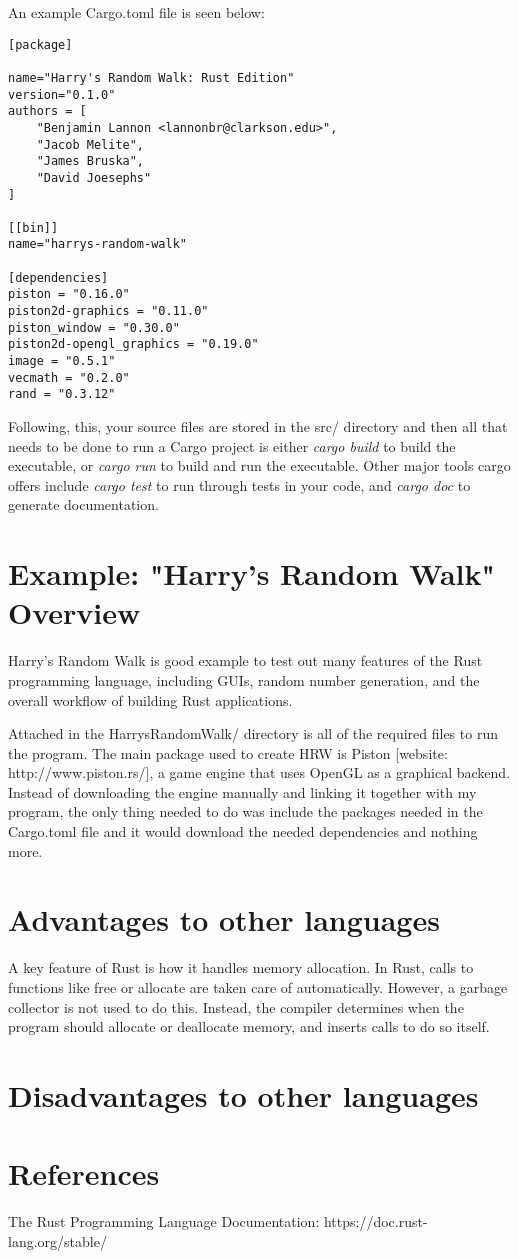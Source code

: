 \documentclass{article}
\begin{document}
An example Cargo.toml file is seen below:

\begin{lstlisting}
[package]

name="Harry's Random Walk: Rust Edition"
version="0.1.0"
authors = [
	"Benjamin Lannon <lannonbr@clarkson.edu>",
	"Jacob Melite",
	"James Bruska",
	"David Joesephs"
]

[[bin]]
name="harrys-random-walk"

[dependencies]
piston = "0.16.0"
piston2d-graphics = "0.11.0"
piston_window = "0.30.0"
piston2d-opengl_graphics = "0.19.0"
image = "0.5.1"
vecmath = "0.2.0"
rand = "0.3.12"
\end{lstlisting}

Following, this, your source files are stored in the src/ directory and then all that needs to be done to run a Cargo project is either \emph{cargo build} to build the executable, or \emph{cargo run} to build and run the executable. Other major tools cargo offers include \emph{cargo test} to run through tests in your code, and \emph{cargo doc} to generate documentation.

\section{Example: "Harry's Random Walk" Overview}
Harry's Random Walk is good example to test out many features of the Rust programming language, including GUIs, random number generation, and the overall workflow of building Rust applications.

Attached in the HarrysRandomWalk/ directory is all of the required files to run the program. The main package used to create HRW is Piston [website: http://www.piston.rs/], a game engine that uses OpenGL as a graphical backend. Instead of downloading the engine manually and linking it together with my program, the only thing needed to do was include the packages needed in the Cargo.toml file and it would download the needed dependencies and nothing more.

\section{Advantages to other languages}
A key feature of Rust is how it handles memory allocation. In Rust, calls to functions like free or allocate are taken care of automatically. However, a garbage collector is not used to do this. Instead, the compiler determines when the program should allocate or deallocate memory, and inserts calls to do so itself. 
\section{Disadvantages to other languages}

\section{References}
The Rust Programming Language Documentation: https://doc.rust-lang.org/stable/
\end{document}
